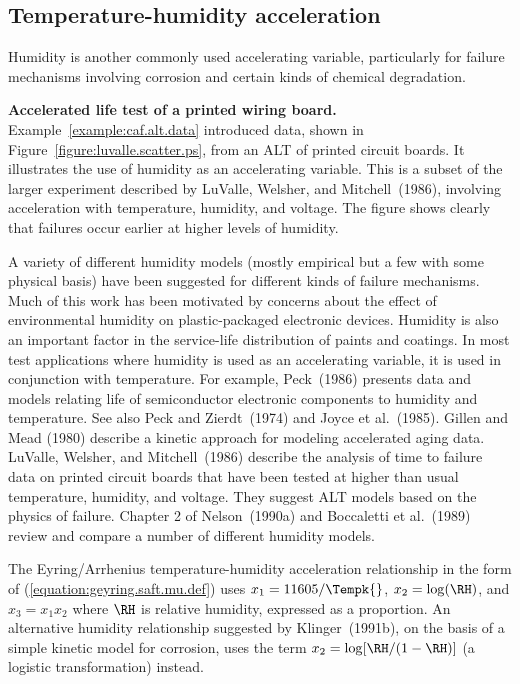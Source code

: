 \subsection{Temperature-humidity acceleration}
\label{section:temp.hum.acc}
Humidity is another commonly used accelerating variable,
particularly for failure mechanisms involving corrosion and certain
kinds of chemical degradation.
\begin{example}{\bf Accelerated life test of a printed wiring board.} 
Example~\ref{example:caf.alt.data} introduced data, shown in
Figure~\ref{figure:luvalle.scatter.ps}, from an ALT of printed circuit
boards. It illustrates the use of humidity as an accelerating variable.
This is a subset of the larger experiment described by LuValle,
Welsher, and Mitchell~(1986), involving  acceleration with
temperature, humidity, and voltage.  The figure shows
clearly that failures occur earlier at higher levels of humidity.
\end{example}
A variety of different humidity models (mostly empirical but a few
with some physical basis) have been suggested for different kinds of
failure mechanisms. Much of this work has been motivated by concerns
about the effect of environmental humidity on plastic-packaged
electronic devices. Humidity is also an important factor in the
service-life distribution of paints and coatings. In most test
applications where humidity is used as an accelerating variable, it
is used in conjunction with temperature.  For example, Peck~(1986)
presents data and models relating life of semiconductor electronic
components to humidity and temperature.  See also Peck and
Zierdt~(1974) and Joyce et al.~(1985).  Gillen and Mead (1980)
describe a kinetic approach for modeling accelerated aging data.
LuValle, Welsher, and
Mitchell~(1986) describe the analysis of time to failure data on
printed circuit boards that have been tested at higher than usual
temperature, humidity, and voltage. They suggest ALT models based on
the physics of failure.  Chapter 2 of Nelson~(1990a) and Boccaletti
et al.~(1989) review and compare a number of different humidity
models.

The Eyring/Arrhenius temperature-humidity acceleration
relationship in the form of (\ref{equation:geyring.saft.mu.def}) uses
$x_{1}=11605/\Tempk{}$, $x_{2}=\log(\RH)$, and $x_{3}=x_{1}x_{2}$
where $\RH$ is relative humidity, expressed as a proportion.  An
alternative humidity relationship suggested by Klinger~(1991b), on
the basis of a simple kinetic model for corrosion, uses the term
$x_{2}=\log[\RH/(1-\RH)]$ (a logistic transformation) instead.




